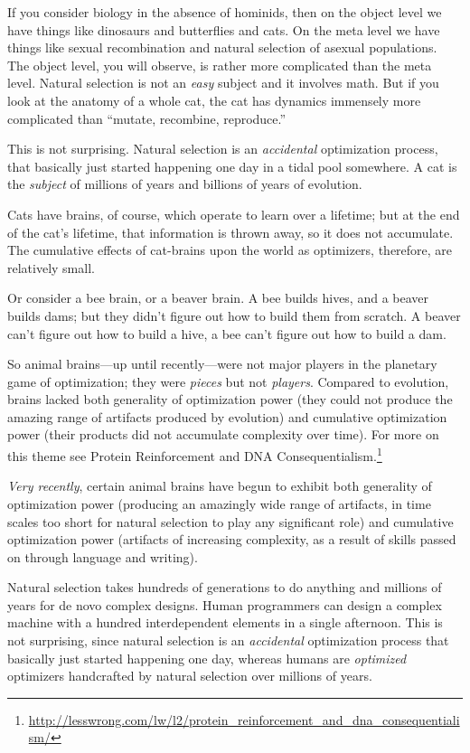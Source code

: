 {{
 If you consider biology in the absence of hominids, then on the
object level we have things like dinosaurs and butterflies and cats. On
the meta level we have things like sexual recombination and natural
selection of asexual populations. The object level, you will observe,
is rather more complicated than the meta level. Natural selection is
not an \textit{easy} subject and it involves math. But if you look at
the anatomy of a whole cat, the cat has dynamics immensely more
complicated than ``mutate, recombine,
reproduce.''}

{
 This is not surprising. Natural selection is an
\textit{accidental} optimization process, that basically just started
happening one day in a tidal pool somewhere. A cat is the
\textit{subject} of millions of years and billions of years of
evolution.}

{
 Cats have brains, of course, which operate to learn over a
lifetime; but at the end of the cat's lifetime, that
information is thrown away, so it does not accumulate. The cumulative
effects of cat-brains upon the world as optimizers, therefore, are
relatively small.}

{
 Or consider a bee brain, or a beaver brain. A bee builds hives,
and a beaver builds dams; but they didn't figure out
how to build them from scratch. A beaver can't figure
out how to build a hive, a bee can't figure out how to
build a dam.}

{
 So animal brains---up until recently---were not major players in
the planetary game of optimization; they were \textit{pieces} but not
\textit{players}. Compared to evolution, brains lacked both generality
of optimization power (they could not produce the amazing range of
artifacts produced by evolution) and cumulative optimization power
(their products did not accumulate complexity over time). For more on
this theme see Protein Reinforcement and DNA Consequentialism.\footnote{\url{http://lesswrong.com/lw/l2/protein_reinforcement_and_dna_consequentialism/}}}

{
 \textit{Very recently}, certain animal brains have begun to
exhibit both generality of optimization power (producing an amazingly
wide range of artifacts, in time scales too short for natural selection
to play any significant role) and cumulative optimization power
(artifacts of increasing complexity, as a result of skills passed on
through language and writing).}

{
 Natural selection takes hundreds of generations to do anything and
millions of years for de novo complex designs. Human programmers can
design a complex machine with a hundred interdependent elements in a
single afternoon. This is not surprising, since natural selection is an
\textit{accidental} optimization process that basically just started
happening one day, whereas humans are \textit{optimized} optimizers
handcrafted by natural selection over millions of years.}

}
